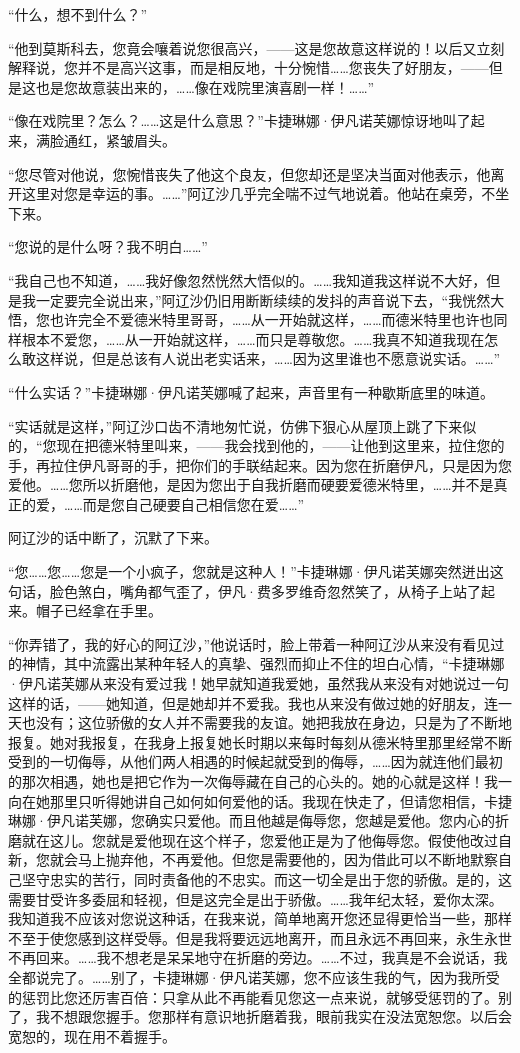 \par “什么，想不到什么？”
\par “他到莫斯科去，您竟会嚷着说您很高兴，——这是您故意这样说的！以后又立刻解释说，您并不是高兴这事，而是相反地，十分惋惜……您丧失了好朋友，——但是这也是您故意装出来的，……像在戏院里演喜剧一样！……”
\par “像在戏院里？怎么？……这是什么意思？”卡捷琳娜·伊凡诺芙娜惊讶地叫了起来，满脸通红，紧皱眉头。
\par “您尽管对他说，您惋惜丧失了他这个良友，但您却还是坚决当面对他表示，他离开这里对您是幸运的事。……”阿辽沙几乎完全喘不过气地说着。他站在桌旁，不坐下来。
\par “您说的是什么呀？我不明白……”
\par “我自己也不知道，……我好像忽然恍然大悟似的。……我知道我这样说不大好，但是我一定要完全说出来，”阿辽沙仍旧用断断续续的发抖的声音说下去，“我恍然大悟，您也许完全不爱德米特里哥哥，……从一开始就这样，……而德米特里也许也同样根本不爱您，……从一开始就这样，……而只是尊敬您。……我真不知道我现在怎么敢这样说，但是总该有人说出老实话来，……因为这里谁也不愿意说实话。……”
\par “什么实话？”卡捷琳娜·伊凡诺芙娜喊了起来，声音里有一种歇斯底里的味道。
\par “实话就是这样，”阿辽沙口齿不清地匆忙说，仿佛下狠心从屋顶上跳了下来似的，“您现在把德米特里叫来，——我会找到他的，——让他到这里来，拉住您的手，再拉住伊凡哥哥的手，把你们的手联结起来。因为您在折磨伊凡，只是因为您爱他。……您所以折磨他，是因为您出于自我折磨而硬要爱德米特里，……并不是真正的爱，……而是您自己硬要自己相信您在爱……”
\par 阿辽沙的话中断了，沉默了下来。
\par “您……您……您是一个小疯子，您就是这种人！”卡捷琳娜·伊凡诺芙娜突然迸出这句话，脸色煞白，嘴角都气歪了，伊凡·费多罗维奇忽然笑了，从椅子上站了起来。帽子已经拿在手里。
\par “你弄错了，我的好心的阿辽沙，”他说话时，脸上带着一种阿辽沙从来没有看见过的神情，其中流露出某种年轻人的真挚、强烈而抑止不住的坦白心情，“卡捷琳娜·伊凡诺芙娜从来没有爱过我！她早就知道我爱她，虽然我从来没有对她说过一句这样的话，——她知道，但是她却并不爱我。我也从来没有做过她的好朋友，连一天也没有；这位骄傲的女人并不需要我的友谊。她把我放在身边，只是为了不断地报复。她对我报复，在我身上报复她长时期以来每时每刻从德米特里那里经常不断受到的一切侮辱，从他们两人相遇的时候起就受到的侮辱，……因为就连他们最初的那次相遇，她也是把它作为一次侮辱藏在自己的心头的。她的心就是这样！我一向在她那里只听得她讲自己如何如何爱他的话。我现在快走了，但请您相信，卡捷琳娜·伊凡诺芙娜，您确实只爱他。而且他越是侮辱您，您越是爱他。您内心的折磨就在这儿。您就是爱他现在这个样子，您爱他正是为了他侮辱您。假使他改过自新，您就会马上抛弃他，不再爱他。但您是需要他的，因为借此可以不断地默察自己坚守忠实的苦行，同时责备他的不忠实。而这一切全是出于您的骄傲。是的，这需要甘受许多委屈和轻视，但是这完全是出于骄傲。……我年纪太轻，爱你太深。我知道我不应该对您说这种话，在我来说，简单地离开您还显得更恰当一些，那样不至于使您感到这样受辱。但是我将要远远地离开，而且永远不再回来，永生永世不再回来。……我不想老是呆呆地守在折磨的旁边。……不过，我真是不会说话，我全都说完了。……别了，卡捷琳娜·伊凡诺芙娜，您不应该生我的气，因为我所受的惩罚比您还厉害百倍：只拿从此不再能看见您这一点来说，就够受惩罚的了。别了，我不想跟您握手。您那样有意识地折磨着我，眼前我实在没法宽恕您。以后会宽恕的，现在用不着握手。
